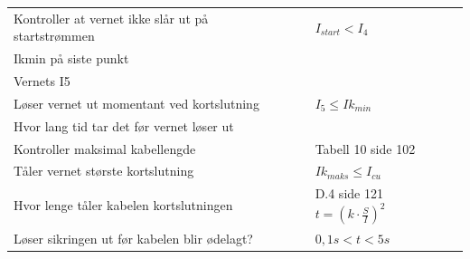 \begin{center}
\begin{tabular}{| m{4cm} |m{4cm} |m{4cm} |}
Kontroller at vernet ikke slår ut på startstrømmen 	& 	&$I_{start}< I_4$						\\ \cline{1-3}
Ikmin på siste punkt		& 				&								\\ \cline{1-3}
Vernets I5			& 				&								\\ \cline{1-3}
Løser vernet ut momentant ved kortslutning		& 	&$I_5\leq Ik_{min}$ 						\\ \cline{1-3}
Hvor lang tid tar det før vernet løser ut		& 	& 								\\ \cline{1-3}
Kontroller maksimal kabellengde 			&	&Tabell 10 side 102 						\\ \cline{1-3}
Tåler vernet største kortslutning 			& 	&$Ik_{maks} \leq I_{cu}$ 					\\ \cline{1-3}
Hvor lenge tåler kabelen kortslutningen  		& 	&D.4 side 121  $t=(k \cdot \frac{S}{I})^2$ 			\\ \cline{1-3}
Løser sikringen ut før kabelen blir ødelagt? 		& 	&$0,1s < t < 5s$ 						\\ \cline{1-3}


		
\end{tabular}
\end{center}



